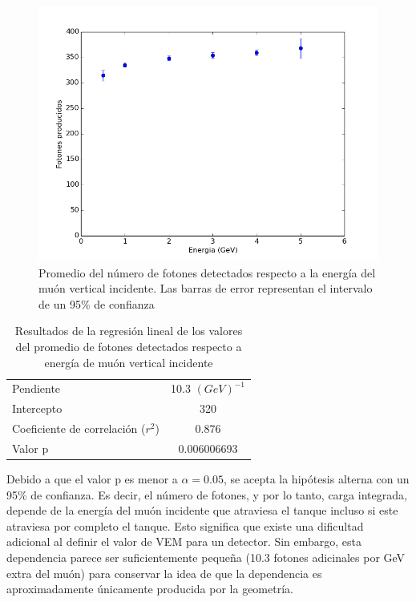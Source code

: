 \documentclass{book}
\begin{document}
\begin{figure}[h] %
\begin{center}
 \includegraphics[width=\linewidth]{DetectadosVsEnergia.png}
\caption{Promedio del n\'umero de fotones detectados respecto a la energ\'ia del mu\'on vertical incidente. Las barras de error representan el intervalo de un 95\% de confianza}
\end{center}
\end{figure}

\pagebreak

\begin{table}[h]
\centering
\caption{ Resultados de la regresi\'on lineal de los valores del promedio de fotones detectados respecto a energ\'ia de mu\'on vertical incidente}
\begin{tabular}{l | c}
\hline
Pendiente & 10.3 $(GeV)^{-1}$ \\
Intercepto & 320 \\
Coeficiente de correlaci\'on ($r^2$) & 0.876 \\
Valor p & 0.006006693 \\

\hline
\end{tabular}
\end{table}

Debido a que el valor p es menor a $\alpha=0.05$, se acepta la hip\'otesis alterna con un 95\% de confianza. Es decir, el número de fotones, y por lo tanto, carga integrada, depende de la energía del muón incidente que atraviesa el tanque incluso si este atraviesa por completo el tanque. Esto significa que existe una dificultad adicional al definir el valor de VEM para un detector. Sin embargo, esta dependencia parece ser suficientemente peque\~na (10.3 fotones adicinales por GeV extra del mu\'on) para conservar la idea de que la dependencia es aproximadamente \'unicamente producida por la geometr\'ia.
\end{document}
